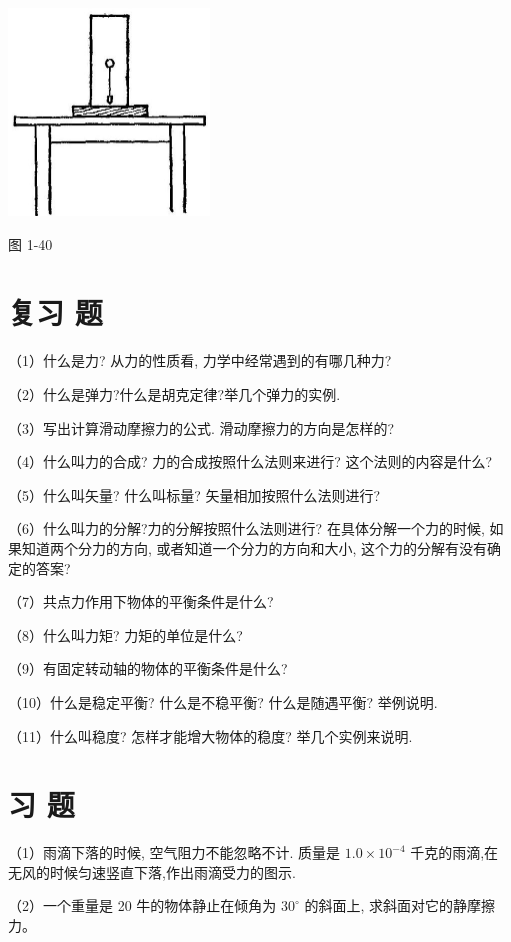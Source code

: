 \documentclass[10pt]{article}
\begin{document}
\begin{center}
\includegraphics[max width=0.4\textwidth]{images/01912d55-147c-70aa-b0e0-1782a122f948_51_707316.jpg}
\end{center}

图 1-40

\section*{复习 题}

（1）什么是力? 从力的性质看, 力学中经常遇到的有哪几种力?

（2）什么是弹力?什么是胡克定律?举几个弹力的实例.

（3）写出计算滑动摩擦力的公式. 滑动摩擦力的方向是怎样的?

（4）什么叫力的合成? 力的合成按照什么法则来进行? 这个法则的内容是什么?

（5）什么叫矢量? 什么叫标量? 矢量相加按照什么法则进行?

（6）什么叫力的分解?力的分解按照什么法则进行? 在具体分解一个力的时候, 如果知道两个分力的方向, 或者知道一个分力的方向和大小, 这个力的分解有没有确定的答案?

（7）共点力作用下物体的平衡条件是什么?

（8）什么叫力矩? 力矩的单位是什么?

（9）有固定转动轴的物体的平衡条件是什么?

（10）什么是稳定平衡? 什么是不稳平衡? 什么是随遇平衡? 举例说明.

（11）什么叫稳度? 怎样才能增大物体的稳度? 举几个实例来说明.

\section*{习 题}

（1）雨滴下落的时候, 空气阻力不能忽略不计. 质量是 \({1.0} \times {10}^{-4}\) 千克的雨滴,在无风的时候匀速竖直下落,作出雨滴受力的图示.

（2）一个重量是 20 牛的物体静止在倾角为 \({30}^{ \circ }\) 的斜面上, 求斜面对它的静摩擦力。
\end{document}
